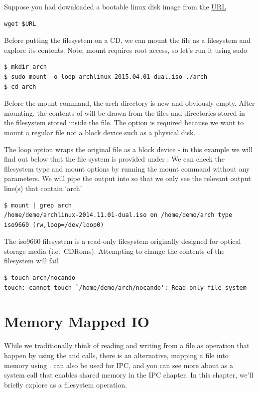 Suppose you had downloaded a bootable linux disk image from the \href{http://cosmos.cites.illinois.edu/pub/archlinux/iso/2015.04.01/archlinux-2015.04.01-dual.iso}{URL}

\begin{verbatim}
wget $URL
\end{verbatim}

Before putting the filesystem on a CD, we can mount the file as a filesystem and explore its contents. Note, mount requires root access, so let's run it using sudo

\begin{verbatim}
$ mkdir arch
$ sudo mount -o loop archlinux-2015.04.01-dual.iso ./arch
$ cd arch
\end{verbatim}

Before the mount command, the arch directory is new and obviously empty. After mounting, the contents of  will be drawn from the files and directories stored in the filesystem stored inside the  file. The  option is required because we want to mount a regular file not a block device such as a physical disk.

The loop option wraps the original file as a block device - in this example we will find out below that the file system is provided under  : We can check the filesystem type and mount options by running the mount command without any parameters. We will pipe the output into  so that we only see the relevant output line(s) that contain `arch'

\begin{verbatim}
$ mount | grep arch
/home/demo/archlinux-2014.11.01-dual.iso on /home/demo/arch type iso9660 (rw,loop=/dev/loop0)
\end{verbatim}

The iso9660 filesystem is a read-only filesystem originally designed for optical storage media (i.e.~CDRoms). Attempting to change the contents of the filesystem will fail

\begin{verbatim}
$ touch arch/nocando
touch: cannot touch `/home/demo/arch/nocando': Read-only file system
\end{verbatim}

\section{Memory Mapped IO}

While we traditionally think of reading and writing from a file as operation that happen by using the  and  calls, there is an alternative, mapping a file into memory using .  can also be used for IPC, and you can see more about  as a system call that enables shared memory in the IPC chapter. In this chapter, we'll briefly explore  as a filesystem operation.

